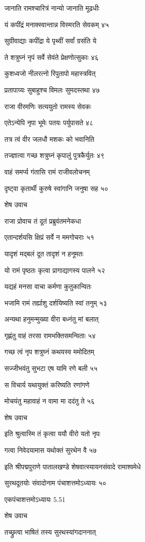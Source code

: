 जानाति रामश्चारित्रं नान्यो जानाति मूढधीः

यं कपींद्रं मनाक्स्वान्तान्न विस्मरति सेवकम् ४५

सुग्रीवाद्याः कपींद्रा ये पृथ्वीं सर्वां ग्रसंति ये

ते शत्रुघ्नं नृपं सर्वे सेवंते प्रेक्षणोत्सुकाः ४६

कुशध्वजो नीलरत्नो रिपुतापो महास्त्रवित्

प्रतापाग्र्यः सुबाहुश्च विमलः सुमदस्तथा ४७

राजा वीरमणिः सत्ययुतो रामस्य सेवकः

एतेऽन्येपि नृपा भूमेः पतयः पर्युपासते ४८

तत्र त्वं वीर जलधौ मशकः को भवानिति

तज्ज्ञात्वा गच्छ शत्रुघ्नं कृपालुं पुत्रकैर्युतः ४९

वाहं समर्प्य गंतासि रामं राजीवलोचनम्

दृष्ट्वा कृतार्थी कुरुषे स्वांगानि जनुषा सह ५०

शेष उवाच

राजा प्रोवाच तं दूतं प्रब्रुवंतमनेकधा

एतान्दर्शयसि क्षिप्रं सर्वे न ममगोचराः ५१

यादृशं मद्बलं दूत तादृशं न हनूमतः

यो रामं पृष्ठतः कृत्वा प्रागाद्यागस्य पालने ५२

यद्यहं मनसा वाचा कर्मणा कुतुकान्वितः

भजामि रामं तर्ह्याशु दर्शयिष्यति स्वां तनुम् ५३

अन्यथा हनुमन्मुख्या वीरा बध्नंतु मां बलात्

गृह्णंतु वाहं तरसा रामभक्तिसमन्विताः ५४

गच्छ त्वं नृप शत्रुघ्नं कथयस्व ममोदितम्

सज्जीभवंतु सुभटा एष यामि रणे बली ५५

स विचार्य यथायुक्तं करिष्यति रणांगणे

मोचयंतु महावाहं न वामा मा ददंतु ते ५६

शेष उवाच

इति श्रुत्वास्मि तं कृत्वा ययौ वीरो यतो नृपः

गत्वा निवेदयामास यथोक्तं सुरथेन वै ५७

इति श्रीपद्मपुराणे पातालखण्डे शेषवात्स्यायनसंवादे रामाश्वमेधे

सुरथदूतयोः संवादोनाम पंचाशत्तमोऽध्यायः ५०

एकपंचाशत्तमोऽध्यायः 5.51

शेष उवाच

तच्छ्रुत्वा भाषितं तस्य सुरथस्यांगदाननात्

